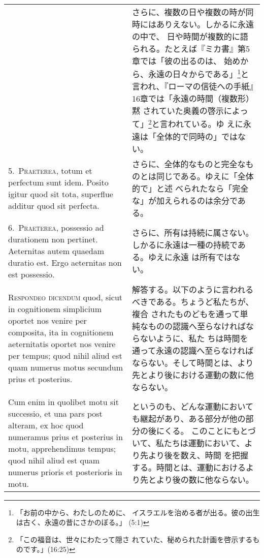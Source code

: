 \documentclass[10pt]{jsarticle} %
\begin{document}
\begin{longtable}{p{21em}p{21em}}
&

さらに、複数の日や複数の時が同時にはありえない。しかるに永遠の中で、
日や時間が複数的に語られる。たとえば『ミカ書』第5章では「彼の出るのは、
始めから、永遠の日々からである」\footnote{「お前の中から、わたしのために、
イスラエルを治める者が出る。彼の出生は古く、永遠の昔にさかのぼる。」
(5:1)}と言われ、『ローマの信徒への手紙』16章では「永遠の時間（複数形） 黙
されていた奥義の啓示によって」\footnote{「この福音は、世々にわたって隠さ
れていた、秘められた計画を啓示するものです。」(16:25)}と言われている。ゆ
えに永遠は「全体的で同時の」ではない。

\\

5.~{\scshape Praeterea}, totum et perfectum sunt idem. Posito igitur quod sit
tota, superflue additur quod sit perfecta.

&

さらに、全体的なものと完全なものとは同じである。ゆえに「全体的で」と述
べられたなら「完全な」が加えられるのは余分である。

\\

6.~{\scshape Praeterea}, possessio ad durationem non pertinet. Aeternitas autem
quaedam duratio est. Ergo aeternitas non est possessio.

&

さらに、所有は持続に属さない。しかるに永遠は一種の持続である。ゆえに永遠
は所有ではない。


\\

{\scshape Respondeo dicendum} quod, sicut in cognitionem simplicium oportet nos
venire per composita, ita in cognitionem aeternitatis oportet nos venire
per tempus; quod nihil aliud est quam numerus motus secundum prius et
posterius.

&


解答する。以下のように言われるべきである。ちょうど私たちが、複合
されたものどもを通って単純なものの認識へ至らなければならないように、私た
ちは時間を通って永遠の認識へ至らなければならない。そして時間とは、より
先とより後における運動の数に他ならない。

\\


Cum enim in quolibet motu sit successio, et una pars post alteram, ex
hoc quod numeramus prius et posterius in motu, apprehendimus tempus;
quod nihil aliud est quam numerus prioris et posterioris in motu.

&

というのも、どんな運動においても継起があり、ある部分が他の部分の後にくる。
このことにもとづいて、私たちは運動において、より先より後を数え、時間
を把握する。時間とは、運動におけるより先とより後の数に他ならない。


\end{longtable}
\end{document}
